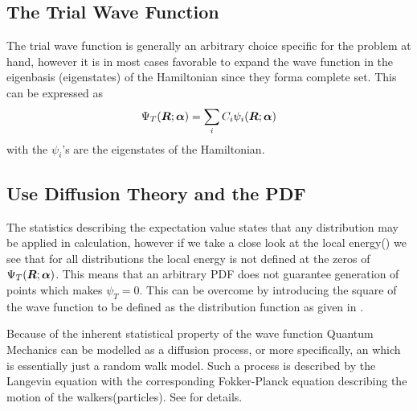     \subsection{The Trial Wave Function}
        The trial wave function is generally an arbitrary choice specific for
        the problem at hand, however it is in most cases favorable to expand
        the wave function in the eigenbasis (eigenstates) of the Hamiltonian
        since they forma complete set. This can be expressed as
            \begin{equation}
                {\Psi}_T(\boldsymbol{{R}};\boldsymbol{{\alpha}}) = \sum_i C_i\psi_i(\boldsymbol{{R}};\boldsymbol{{\alpha}})
            \end{equation}
        with the $\psi_i$'s are the eigenstates of the Hamiltonian.

    \subsection{Use Diffusion Theory and the PDF\label{susec:diffTHpdf}}
        The statistics describing the expectation value states that any
        distribution may be applied in calculation, however if we take a close
        look at the local energy() we see that for all
        distributions the local energy is not defined at the zeros of ${\Psi}_T(\boldsymbol{{R}};\boldsymbol{{\alpha}})$.
        This means that an arbitrary PDF does not guarantee generation of
        points which makes $\psi_T=0$. This can be overcome by introducing the
        square of the wave function to be defined as the distribution function
        as given in .

        Because of the inherent statistical property of the wave function
        Quantum Mechanics can be modelled as a diffusion process, or more
        specifically, an  which is
        essentially just a random walk model. Such a process is described by
        the Langevin equation with the corresponding Fokker-Planck equation
        describing the motion of the walkers(particles). See \cite{numstoch}
        for details.

